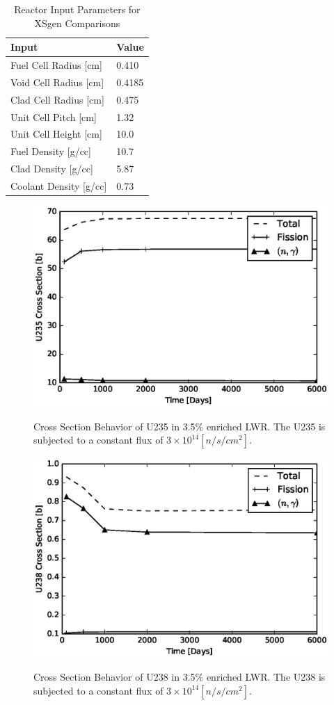 \documentclass{article}
\begin{document}
\begin{table}[!htb]
\centering
\caption{Reactor Input Parameters for XSgen Comparisons}
\label{tab:xsgenstats1}
\begin{tabular}{ll}
Input & Value \\
\hline
Fuel Cell Radius [cm] & 0.410 \\
Void Cell Radius [cm] & 0.4185 \\
Clad Cell Radius [cm] & 0.475 \\
Unit Cell Pitch  [cm] & 1.32 \\
Unit Cell Height [cm] & 10.0 \\
Fuel Density [g/cc] & 10.7 \\
Clad Density [g/cc] & 5.87 \\
Coolant Density [g/cc] & 0.73 \\
\end{tabular}
\end{table}

\begin{figure}
\caption{Cross Section Behavior of U235 in 3.5\% enriched LWR.
         The U235 is subjected to a constant flux of $3\times10^{14}[n/s/cm^2]$.}
\includegraphics[scale=0.8]{U235xs.eps}
\label{fig:u235xs}
\end{figure}

\begin{figure}
\caption{Cross Section Behavior of U238 in 3.5\% enriched LWR. The U238 is subjected to a constant flux of $3\times10^{14}[n/s/cm^2]$.}
\includegraphics[scale=0.8]{U238xs.eps}
\label{fig:u238xs}
\end{figure}
\end{document}
